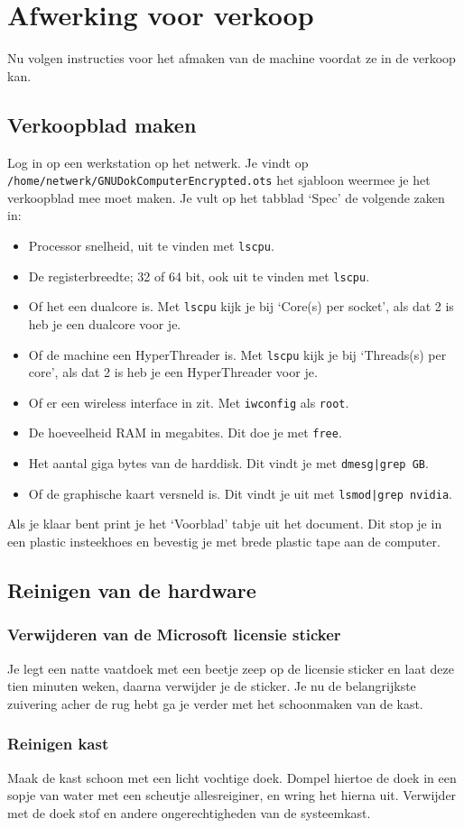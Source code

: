 \section{Afwerking voor verkoop}
Nu volgen instructies voor het afmaken van de machine voordat ze in de verkoop kan.
\subsection{Verkoopblad maken}
Log in op een werkstation op het netwerk. Je vindt op \texttt{/home/netwerk/GNUDokComputerEncrypted.ots} het sjabloon weermee je het verkoopblad mee moet maken. Je vult op het tabblad `Spec' de volgende zaken in:
\begin{itemize}
	\item Processor snelheid, uit te vinden met \texttt{lscpu}.
	\item De registerbreedte; 32 of 64 bit, ook uit te vinden met \texttt{lscpu}.
	\item Of het een dualcore is. Met \texttt{lscpu} kijk je bij `Core(s) per socket', als dat 2 is heb je een dualcore voor je.
	\item Of de machine een HyperThreader is. Met \texttt{lscpu} kijk je bij `Threads(s) per core', als dat 2 is heb je een HyperThreader voor je. 
	\item Of er een wireless interface in zit. Met \texttt{iwconfig} als \texttt{root}.
	\item De hoeveelheid RAM in megabites. Dit doe je met \texttt{free}.
	\item Het aantal giga bytes van de harddisk. Dit vindt je met \texttt{dmesg|grep GB}.
	\item Of de graphische kaart versneld is. Dit vindt je uit met \texttt{lsmod|grep nvidia}.
\end{itemize}

Als je klaar bent print je het `Voorblad' tabje uit het document. Dit stop je in een plastic insteekhoes en bevestig je met brede plastic tape aan de computer.
\subsection{Reinigen van de hardware}
\subsubsection{Verwijderen van de Microsoft licensie sticker}
Je legt een natte vaatdoek met een beetje zeep op de licensie sticker en laat deze tien minuten weken, daarna verwijder je de sticker. Je nu de belangrijkste zuivering acher de rug hebt ga je verder met het schoonmaken van de kast.
\subsubsection{Reinigen kast}
Maak de kast schoon met een licht vochtige doek. Dompel hiertoe de doek in een sopje van water met een scheutje allesreiginer, en wring het hierna uit. Verwijder met de doek stof en andere ongerechtigheden van de systeemkast.
